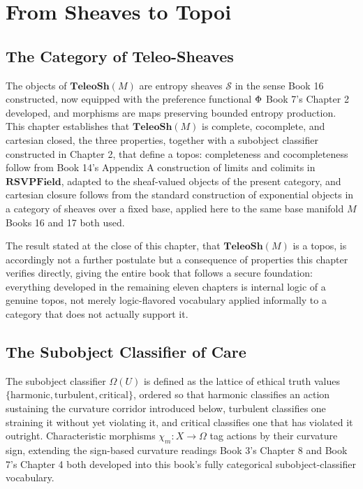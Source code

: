 \part{From Sheaves to Topoi}

\chapter{The Category of Teleo-Sheaves}

The objects of $\mathbf{TeleoSh}(M)$ are entropy sheaves $\mathcal{S}$ in the sense Book 16 constructed, now equipped with the preference functional $\Phi$ Book 7's Chapter 2 developed, and morphisms are maps preserving bounded entropy production. This chapter establishes that $\mathbf{TeleoSh}(M)$ is complete, cocomplete, and cartesian closed, the three properties, together with a subobject classifier constructed in Chapter 2, that define a topos: completeness and cocompleteness follow from Book 14's Appendix A construction of limits and colimits in $\mathbf{RSVPField}$, adapted to the sheaf-valued objects of the present category, and cartesian closure follows from the standard construction of exponential objects in a category of sheaves over a fixed base, applied here to the same base manifold $M$ Books 16 and 17 both used.

The result stated at the close of this chapter, that $\mathbf{TeleoSh}(M)$ is a topos, is accordingly not a further postulate but a consequence of properties this chapter verifies directly, giving the entire book that follows a secure foundation: everything developed in the remaining eleven chapters is internal logic of a genuine topos, not merely logic-flavored vocabulary applied informally to a category that does not actually support it.

\chapter{The Subobject Classifier of Care}

The subobject classifier $\Omega(U)$ is defined as the lattice of ethical truth values $\{\text{harmonic}, \text{turbulent}, \text{critical}\}$, ordered so that harmonic classifies an action sustaining the curvature corridor introduced below, turbulent classifies one straining it without yet violating it, and critical classifies one that has violated it outright. Characteristic morphisms $\chi_m: X \to \Omega$ tag actions by their curvature sign, extending the sign-based curvature readings Book 3's Chapter 8 and Book 7's Chapter 4 both developed into this book's fully categorical subobject-classifier vocabulary.

